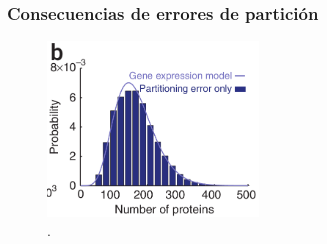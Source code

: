 \documentclass{beamer}
\begin{document}

\begin{frame}
\frametitle{Consecuencias de errores de partici\'on}

\begin{figure}[p]
    \centering
    \includegraphics[width=0.5\textwidth]{fitting.png}\\
    \tiny \cite{huh11a}.
\end{figure}
\end{frame}
\end{document}
